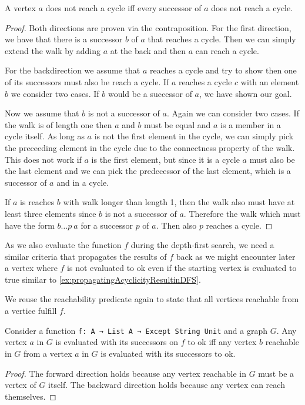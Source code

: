 \begin{lemma}[\NotreachesCycleIffSuccessorsNotReachCycle]
  A vertex $a$ does not reach a cycle iff every successor of $a$ does not reach a cycle.
\end{lemma}
\begin{proof}
  Both directions are proven via the contraposition. For the first direction, we have that there is a successor $b$ of $a$ that reaches a cycle. Then we can simply extend the walk by adding $a$ at the back and then $a$ can reach a cycle.

  For the backdirection we assume that $a$ reaches a cycle and try to show then one of its successors must also be reach a cycle. 
  If $a$ reaches a cycle $c$ with an element $b$ we consider two cases. 
  If $b$ would be a successor of $a$, we have shown our goal.
  
  Now we assume that $b$ is not a successor of $a$. Again we can consider two cases. If the walk is of length one then $a$ and $b$ must be equal and $a$ is a member in a cycle itself. As long as $a$ is not the first element in the cycle, we can simply pick the preceeding element in the cycle due to the connectness property of the walk. This does not work if $a$ is the first element, but since it is a cycle $a$ must also be the last element and we can pick the predecessor of the last element, which is a successor of $a$ and in a cycle.

  If $a$ is reaches $b$ with walk longer than length 1, then the walk also must have at least three elements since $b$ is not a successor of $a$. Therefore the walk which must have the form $b \dots p\ a$ for a successor $p$ of $a$. Then also $p$ reaches a cycle.
\end{proof}

As we also evaluate the function $f$ during the depth-first search, we need a similar criteria that propagates the results of $f$ back as we might encounter later a vertex where $f$ is not evaluated to ok even if the starting vertex is evaluated to true similar to \cref{ex:propagatingAcyclicityResultinDFS}.

We reuse the reachability predicate again to state that all vertices reachable from a vertice fulfill $f$.

\begin{lemma}[\allTrueIfAllCanReachTrue]
  Consider a function \lstinline|f: A → List A → Except String Unit| and a graph $G$. Any vertex $a$ in $G$ is evaluated with its successors on $f$ to ok iff any vertex $b$ reachable in $G$ from a vertex $a$ in $G$ is evaluated with its successors to ok.
\end{lemma}
\begin{proof}
  The forward direction holds because any vertex reachable in $G$ must be a vertex of $G$ itself. The backward direction holds because any vertex can reach themselves.
\end{proof}

